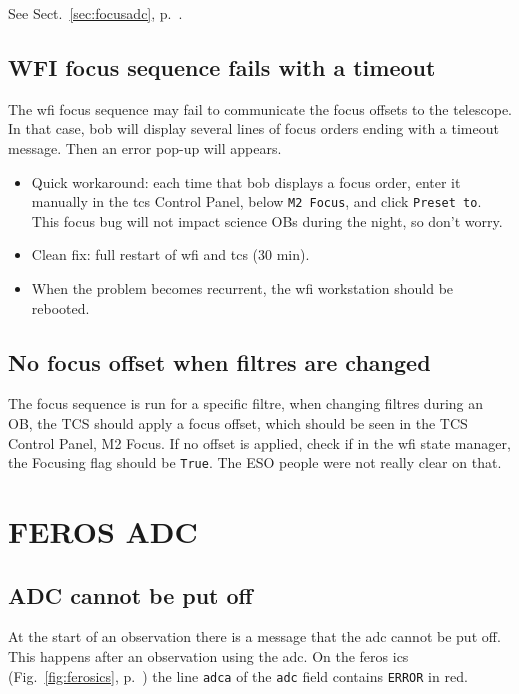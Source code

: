 \documentclass[11pt,fleqn]{book}
\def\figref#1{Fig.~\ref{fig:#1}, p.~\pageref{fig:#1}}
\def\secref#1{Sect.~\ref{sec:#1}, p.~\pageref{sec:#1}}
\begin{document}
See \secref{focusadc}.

\subsection{WFI focus sequence fails with a timeout}
\label{sec:wfifocseq}
The \gls{wfi} focus sequence may fail to communicate the focus offsets to the telescope.  In that case, \gls{bob} will display several lines of focus orders ending with a timeout message. Then an error pop-up will appears.

\begin{itemize}
   \item Quick workaround: each time that \gls{bob} displays a focus order, enter it manually in the \gls{tcs} Control Panel, below \texttt{M2 Focus}, and click \texttt{Preset to}.  This focus bug will not impact science OBs during the night, so don't worry.
   \item Clean fix: full restart of \gls{wfi} and \gls{tcs} (30 min).
   \item When the problem becomes recurrent, the \gls{wfi} workstation should
be rebooted.
\end{itemize}

\subsection{No focus offset when filtres are changed}
\label{sec:filfocoffset}
The focus sequence is run for a specific filtre, when changing filtres during an OB, the TCS should apply a focus offset, which should be seen in the TCS Control Panel, M2 Focus. If no offset is applied, check if in the \gls{wfi} state manager, the Focusing flag should be \texttt{True}. The ESO people were not really clear on that.


\section{FEROS ADC}

\subsection{ADC cannot be put off}

At the start of an observation there is a message that the \gls{adc} cannot be
put off.  This happens after an observation using the \gls{adc}.  On the 
\gls{feros} \gls{ics} (\figref{ferosics}) the line \texttt{adca} of the
\texttt{adc} field contains \texttt{ERROR} in red.  
\end{document}
